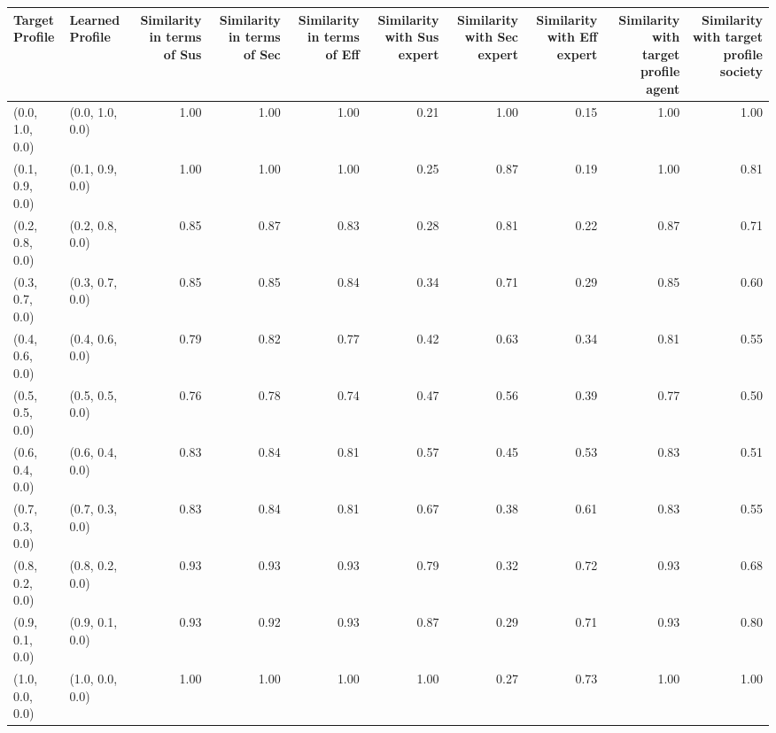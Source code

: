 \begin{tabular}{llrrrrrrrr}
\toprule
Target Profile & Learned Profile & Similarity in terms of Sus & Similarity in terms of Sec & Similarity in terms of Eff & Similarity with Sus expert & Similarity with Sec expert & Similarity with Eff expert & Similarity with target profile agent & Similarity with target profile society \\
\midrule
(0.0, 1.0, 0.0) & (0.0, 1.0, 0.0) & 1.00 & 1.00 & 1.00 & 0.21 & 1.00 & 0.15 & 1.00 & 1.00 \\
(0.1, 0.9, 0.0) & (0.1, 0.9, 0.0) & 1.00 & 1.00 & 1.00 & 0.25 & 0.87 & 0.19 & 1.00 & 0.81 \\
(0.2, 0.8, 0.0) & (0.2, 0.8, 0.0) & 0.85 & 0.87 & 0.83 & 0.28 & 0.81 & 0.22 & 0.87 & 0.71 \\
(0.3, 0.7, 0.0) & (0.3, 0.7, 0.0) & 0.85 & 0.85 & 0.84 & 0.34 & 0.71 & 0.29 & 0.85 & 0.60 \\
(0.4, 0.6, 0.0) & (0.4, 0.6, 0.0) & 0.79 & 0.82 & 0.77 & 0.42 & 0.63 & 0.34 & 0.81 & 0.55 \\
(0.5, 0.5, 0.0) & (0.5, 0.5, 0.0) & 0.76 & 0.78 & 0.74 & 0.47 & 0.56 & 0.39 & 0.77 & 0.50 \\
(0.6, 0.4, 0.0) & (0.6, 0.4, 0.0) & 0.83 & 0.84 & 0.81 & 0.57 & 0.45 & 0.53 & 0.83 & 0.51 \\
(0.7, 0.3, 0.0) & (0.7, 0.3, 0.0) & 0.83 & 0.84 & 0.81 & 0.67 & 0.38 & 0.61 & 0.83 & 0.55 \\
(0.8, 0.2, 0.0) & (0.8, 0.2, 0.0) & 0.93 & 0.93 & 0.93 & 0.79 & 0.32 & 0.72 & 0.93 & 0.68 \\
(0.9, 0.1, 0.0) & (0.9, 0.1, 0.0) & 0.93 & 0.92 & 0.93 & 0.87 & 0.29 & 0.71 & 0.93 & 0.80 \\
(1.0, 0.0, 0.0) & (1.0, 0.0, 0.0) & 1.00 & 1.00 & 1.00 & 1.00 & 0.27 & 0.73 & 1.00 & 1.00 \\
\bottomrule
\end{tabular}
